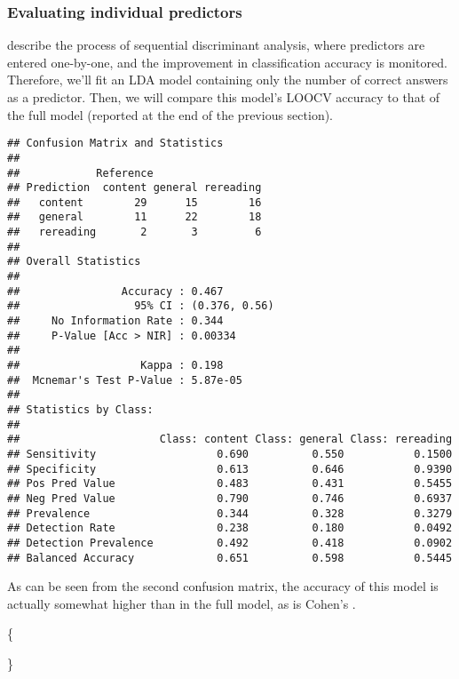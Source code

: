 \documentclass[12pt,]{article}
\begin{document}
\hypertarget{evaluating-individual-predictors}{%
\subsubsection{Evaluating individual
predictors}\label{evaluating-individual-predictors}}

\citet{tabachnick_using_2012} describe the process of sequential
discriminant analysis, where predictors are entered one-by-one, and the
improvement in classification accuracy is monitored. Therefore, we'll
fit an LDA model containing only the number of correct answers as a
predictor. Then, we will compare this model's LOOCV accuracy to that of
the full model (reported at the end of the previous section).

\begin{verbatim}
## Confusion Matrix and Statistics
## 
##            Reference
## Prediction  content general rereading
##   content        29      15        16
##   general        11      22        18
##   rereading       2       3         6
## 
## Overall Statistics
##                                        
##                Accuracy : 0.467        
##                  95% CI : (0.376, 0.56)
##     No Information Rate : 0.344        
##     P-Value [Acc > NIR] : 0.00334      
##                                        
##                   Kappa : 0.198        
##  Mcnemar's Test P-Value : 5.87e-05     
## 
## Statistics by Class:
## 
##                      Class: content Class: general Class: rereading
## Sensitivity                   0.690          0.550           0.1500
## Specificity                   0.613          0.646           0.9390
## Pos Pred Value                0.483          0.431           0.5455
## Neg Pred Value                0.790          0.746           0.6937
## Prevalence                    0.344          0.328           0.3279
## Detection Rate                0.238          0.180           0.0492
## Detection Prevalence          0.492          0.418           0.0902
## Balanced Accuracy             0.651          0.598           0.5445
\end{verbatim}

As can be seen from the second confusion matrix, the accuracy of this
model is actually somewhat higher than in the full model, as is Cohen's
\textkappa.

\{ 


    

\}
\end{document}
